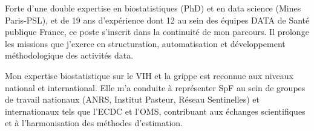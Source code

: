 \documentclass[11pt, a4paper]{awesome-cv}
\begin{document}
\begin{cvletter}
%
%
%
%
%
%
\vspace{0.5ex}


Forte d’une double expertise en biostatistiques (PhD) et en data science (Mines Paris-PSL), et de 19 ans d’expérience dont 12 au sein des équipes DATA de Santé publique France, ce poste s’inscrit dans la continuité de mon parcours. Il prolonge les missions que j’exerce en structuration, automatisation et développement méthodologique des activités data.


\vspace{0.5ex}

Mon expertise biostatistique sur le VIH et la grippe est reconnue aux niveaux national et international. Elle m’a conduite à représenter SpF au sein de groupes de travail nationaux (ANRS, Institut Pasteur, Réseau Sentinelles) et internationaux tels que l’ECDC et l’OMS, contribuant aux échanges scientifiques et à l’harmonisation des méthodes d’estimation.


\end{cvletter}
\end{document}
